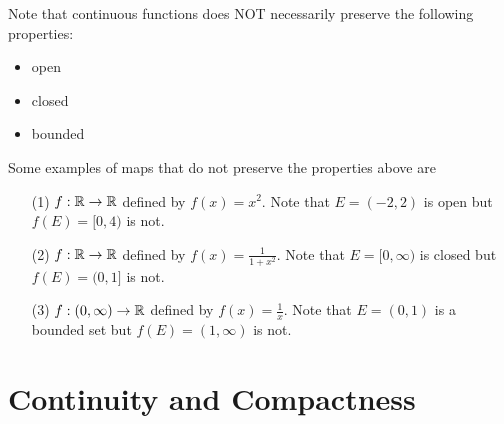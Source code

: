 \documentclass[a4paper]{article}
\begin{document}
Note that continuous functions does NOT necessarily preserve the following properties:
\begin{itemize}
    \item open
    \item closed
    \item bounded
\end{itemize}

Some examples of maps that do not preserve the properties above are

\begin{enumerate}
    \item[(1)] \( f: \mathbb{R} \to \mathbb{R}  \) defined by \( f(x) = x^{2} \). Note that \( E = (-2,2) \) is open but \( f(E) = [0,4) \) is not.
    \item[(2)] \( f: \mathbb{R} \to \mathbb{R}  \) defined by \( f(x) = \frac{ 1  }{  1 + x^{2} }  \). Note that \( E = [0,\infty)  \) is closed but \( f(E) = (0,1] \) is not.
    \item[(3)] \( f: (0,\infty ) \to \mathbb{R}  \) defined by \( f(x) = \frac{ 1 }{ x }  \). Note that \( E = (0,1) \) is a bounded set but \( f(E) = (1,\infty  ) \) is not.
\end{enumerate} 


\section{Continuity and Compactness}\label{Continuity and Compactness}
\end{document}
